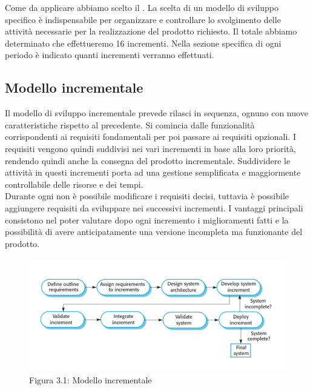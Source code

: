 Come  da applicare abbiamo scelto il . La scelta di un modello di sviluppo specifico è indispensabile per organizzare e controllare lo svolgimento delle attività necessarie per la realizzazione del prodotto richiesto. Il totale abbiamo determinato che effettueremo 16 incrementi. Nella sezione specifica di ogni periodo è indicato quanti incrementi verranno effettuati.

\subsection{Modello incrementale}
Il modello di sviluppo incrementale prevede rilasci in sequenza, ognuno con nuove caratteristiche rispetto al precedente. Si comincia dalle funzionalità corrispondenti ai requisiti fondamentali per poi passare ai requisiti opzionali. I requisiti vengono quindi suddivisi nei vari incrementi in base alla loro priorità, rendendo quindi anche la consegna del prodotto incrementale.
Suddividere le attività in questi incrementi porta ad una gestione semplificata e maggiormente controllabile delle risorse e dei tempi.\\
Durante ogni  non è possibile modificare i requisiti decisi, tuttavia è possibile aggiungere requisiti da sviluppare nei successivi incrementi.
I vantaggi principali consistono nel poter valutare dopo ogni incremento i miglioramenti fatti e la possibilità di avere anticipatamente una versione incompleta ma funzionante del prodotto. \\
\begin{center}
\begin{figure} [H]
	\centering
	\includegraphics[scale=0.65]{Img/Schema_modello_incrementale}
	\caption{Figura 3.1: Modello incrementale}\label{}
\end{figure}
\end{center}
